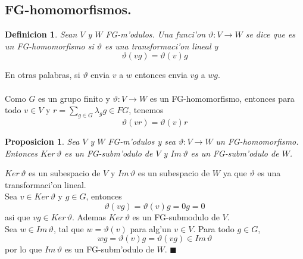 \documentclass[a4paper,openright,12pt]{book}
\numberwithin{equation}{section} %
\newtheorem{proposicion}{Proposicion}[section] %
\newtheorem{definicion}{Definicion}[section] %
\newenvironment{proof}{\noindent{\it Demostracion:}}{\hfill$\blacksquare$} %
\begin{document}
\subsection{FG-homomorfismos.}
\begin{definicion}
Sean $V$ y $W$ FG-m'odulos. Una funci'on $\vartheta : V \rightarrow W$ se dice que es un FG-homomorfismo si $\vartheta$ es una transformaci'on lineal y 
\[
\vartheta (vg) = \vartheta (v)g
\]
\end{definicion}
En otras palabras, si $\vartheta$ envia $v$ a $w$ entonces envia $vg$ a $wg$.\\
\\
Como $G$ es un grupo finito y $\vartheta : V \rightarrow W$ es un FG-homomorfismo, entonces para todo $v \in V$ y $r=\sum_{g \in G} \lambda_{g}g \in FG$, tenemos
\[
\vartheta (vr) = \vartheta (v)r
\]
\begin{proposicion}
Sea $V$ y $W$ FG-m'odulos y sea $\vartheta : V \rightarrow W$ un FG-homomorfismo. Entonces $Ker \, \vartheta$ es un FG-subm'odulo de $V$ y $Im \, \vartheta$ es un FG-subm'odulo de $W$.
\end{proposicion}
\begin{proof}
$Ker \, \vartheta$ es un subespacio de $V$ y $Im \, \vartheta$ es un subespacio de $W$ ya que $\vartheta$ es una transformaci'on lineal.\\
Sea $v \in Ker \, \vartheta$ y $g \in G$, entonces
\[
\vartheta (vg) = \vartheta (v)g = 0g = 0
\]
asi que $vg \in Ker \, \vartheta$. Ademas $Ker \, \vartheta$ es un FG-submodulo de $V$.\\
Sea $w \in Im \, \vartheta$, tal que $w = \vartheta (v)$ para alg'un $v \in V$. Para todo $g \in G$,
\[
wg = \vartheta (v)g = \vartheta (vg) \in Im \, \vartheta
\]
por lo que $Im \, \vartheta$ es un FG-subm'odulo de $W$.
\end{proof}
\end{document}

